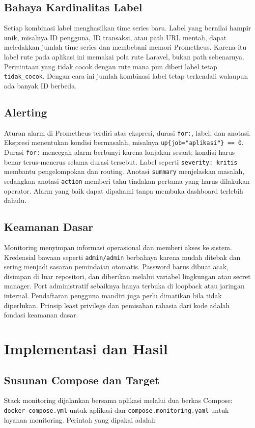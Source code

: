 \documentclass[a4paper,oneside,11pt]{book}
\begin{document}
\section{Bahaya Kardinalitas Label}
Setiap kombinasi label menghasilkan time series baru. Label yang bernilai hampir unik, misalnya ID pengguna, ID transaksi, atau path URL mentah, dapat meledakkan jumlah time series dan membebani memori Prometheus. Karena itu label rute pada aplikasi ini memakai pola rute Laravel, bukan path sebenarnya. Permintaan yang tidak cocok dengan rute mana pun diberi label tetap \texttt{tidak\_cocok}. Dengan cara ini jumlah kombinasi label tetap terkendali walaupun ada banyak ID berbeda.

\section{Alerting}
Aturan alarm di Prometheus terdiri atas ekspresi, durasi \texttt{for:}, label, dan anotasi. Ekspresi menentukan kondisi bermasalah, misalnya \texttt{up\{job="aplikasi"\} == 0}. Durasi \texttt{for:} mencegah alarm berbunyi karena lonjakan sesaat; kondisi harus benar terus-menerus selama durasi tersebut. Label seperti \texttt{severity: kritis} membantu pengelompokan dan routing. Anotasi \texttt{summary} menjelaskan masalah, sedangkan anotasi \texttt{action} memberi tahu tindakan pertama yang harus dilakukan operator. Alarm yang baik dapat dipahami tanpa membuka dashboard terlebih dahulu.

\section{Keamanan Dasar}
Monitoring menyimpan informasi operasional dan memberi akses ke sistem. Kredensial bawaan seperti \texttt{admin/admin} berbahaya karena mudah ditebak dan sering menjadi sasaran pemindaian otomatis. Password harus dibuat acak, disimpan di luar repositori, dan diberikan melalui variabel lingkungan atau secret manager. Port administratif sebaiknya hanya terbuka di loopback atau jaringan internal. Pendaftaran pengguna mandiri juga perlu dimatikan bila tidak diperlukan. Prinsip least privilege dan pemisahan rahasia dari kode adalah fondasi keamanan dasar.

\chapter{Implementasi dan Hasil}

\section{Susunan Compose dan Target}
Stack monitoring dijalankan bersama aplikasi melalui dua berkas Compose: \texttt{docker-compose.yml} untuk aplikasi dan \texttt{compose.monitoring.yaml} untuk layanan monitoring. Perintah yang dipakai adalah:
\end{document}

